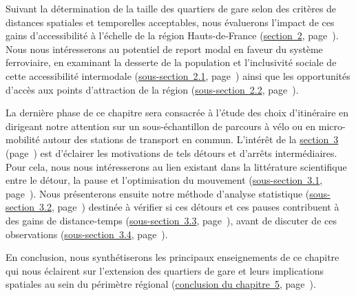 \begin{refsegment}
Suivant la détermination de la taille des quartiers de gare selon des critères de distances spatiales et temporelles acceptables, nous évaluerons l'impact de ces gains d'accessibilité à l'échelle de la région Hauts-de-France (\hyperref[chap5:accessibilite-intermodale-extension-aire-influence]{section~2}, page~\pageref{chap5:accessibilite-intermodale-extension-aire-influence}). Nous nous intéresserons au potentiel de report modal en faveur du système ferroviaire, en examinant la desserte de la population et l'inclusivité sociale de cette accessibilité intermodale (\hyperref[chap5:couverture-population]{sous-section~2.1}, page~\pageref{chap5:couverture-population}) ainsi que les opportunités d'accès aux points d'attraction de la région (\hyperref[chap5:couverture-population]{sous-section~2.2}, page~\pageref{chap5:accessibilite-emplois}).%

La dernière phase de ce chapitre sera consacrée à l'étude des choix d'itinéraire en dirigeant notre attention sur un sous-échantillon de parcours à vélo ou en micro-mobilité autour des stations de transport en commun. L'intérêt de la \hyperref[chap5:detours-pauses-optimisation]{section~3} (page~\pageref{chap5:detours-pauses-optimisation}) est d'éclairer les motivations de tels détours et d'arrêts intermédiaires. Pour cela, nous nous intéresserons au lien existant dans la littérature scientifique entre le détour, la pause et l'optimisation du mouvement (\hyperref[chap5:enjeux-detours-pauses]{sous-section~3.1}, page~\pageref{chap5:enjeux-detours-pauses}). Nous présenterons ensuite notre méthode d'analyse statistique (\hyperref[chap5:methodes-statistiques]{sous-section~3.2}, page~\pageref{chap5:methodes-statistiques}) destinée à vérifier si ces détours et ces pauses contribuent à des gains de distance-temps (\hyperref[chap5:strategies-optimisation]{sous-section~3.3}, page~\pageref{chap5:strategies-optimisation}), avant de discuter de ces observations (\hyperref[chap5:discussion-detours-pauses-optimisation]{sous-section~3.4}, page~\pageref{chap5:discussion-detours-pauses-optimisation}).%

En conclusion, nous synthétiserons les principaux enseignements de ce chapitre qui nous éclairent sur l'extension des quartiers de gare et leurs implications spatiales au sein du périmètre régional (\hyperref[chap5:conclusion]{conclusion du chapitre~5}, page~\pageref{chap5:conclusion}).%

    \newpage

\end{refsegment}
